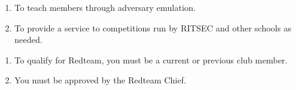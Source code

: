 

\begin{enumerate}
  \item To teach members through adversary emulation.
  \item To provide a service to competitions run by RITSEC and other schools as
    needed.
\end{enumerate}


\begin{enumerate}
  \item To qualify for Redteam, you must be a current or previous club member.
  \item You must be approved by the Redteam Chief.
\end{enumerate}